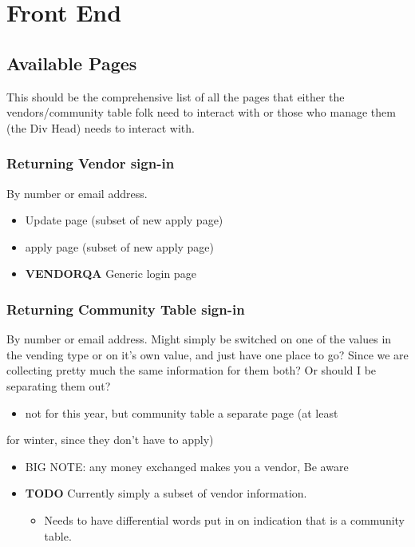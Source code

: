\documentclass[captions=tablesignature]{scrartcl}
\begin{document}
\section{Front End}
\label{sec-3}
\subsection{Available Pages}
\label{sec-3-1}
This should be the comprehensive list of all the pages that either
the vendors/community table folk need to interact with or those who
manage them (the Div Head) needs to interact with.
\subsubsection{Returning Vendor sign-in}
\label{sec-3-1-1}
By number or email address.
\begin{itemize}
\item Update page (subset of new apply page)
\item apply page (subset of new apply page)
\end{itemize}
\begin{itemize}
\item {\bfseries\sffamily VENDORQA} Generic login page
\label{sec-3-1-1-1}
\end{itemize}

\subsubsection{Returning Community Table sign-in}
\label{sec-3-1-2}
By number or email address.  Might simply be switched on one of
the values in the vending type or on it's own value, and just have
one place to go?  Since we are collecting pretty much the same
information for them both?  Or should I be separating them out?
\begin{itemize}
\item not for this year, but community table a separate page (at least
\end{itemize}
for winter, since they don't have to apply)
\begin{itemize}
\item BIG NOTE: any money exchanged makes you a vendor, Be aware
\end{itemize}
\begin{itemize}
\item {\bfseries\sffamily TODO} Currently simply a subset of vendor information.
\label{sec-3-1-2-1}
\begin{itemize}
\item Needs to have differential words put in on indication that is a
community table.
\end{itemize}
\end{itemize}
\end{document}
